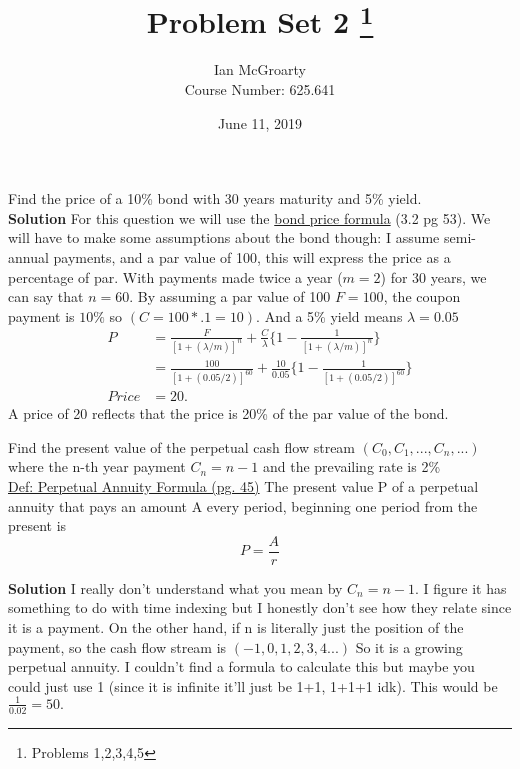 \documentclass[12pt]{article}
\title{Problem Set 2 \thanks{Problems 1,2,3,4,5}}
\author{Ian McGroarty \\
	Course Number: 625.641}
\date{June 11, 2019}
\newenvironment{problem}[2][Problem]{\begin{trivlist}
\item[\hskip \labelsep {\bfseries #1}\hskip \labelsep {\bfseries #2.}]}{\end{trivlist}}
\begin{document}
\maketitle
\newpage

\begin{problem}{1}  Find the price of a 10\% bond with 30 years maturity and 5\% yield. \\
\textbf{Solution} For this question we will use the \underline{bond price formula} (3.2 pg 53). We will have to make some assumptions about the bond though: I assume semi-annual payments, and a par value of 100, this will express the price as a percentage of par. With payments made twice a year ($m=2$) for 30 years, we can say that $n=60$. By assuming a par value of 100 $F=100$, the coupon payment is $10\%$ so $(C=100*.1=10)$.  And a 5\% yield means $\lambda = 0.05$
\begin{align*}
P&= \frac{F}{[1+(\lambda / m)]^n} + \frac{C}{\lambda }\{ 1- \frac{1}{[1+(\lambda / m)]^n}\}\\
&= \frac{100}{[1+(0.05/2)]^60} + \frac{10}{0.05}\{1- \frac{1}{[1+(0.05/2)]^60} \} \\ 
Price &= 20. 
\end{align*}
A price of 20 reflects that the price is 20\% of the par value of the bond. 
\end{problem}

\begin{problem}{2}  Find the present value of the perpetual cash flow stream $(C_0,C_1,...,C_n,...)$ where the n-th year payment $C_n = n-1$ and the prevailing rate is 2\%  \\
 \underline{Def: Perpetual Annuity Formula (pg. 45)} The present value P of a perpetual annuity that pays an amount A every period, beginning one period from the present is $$ P = \frac{A}{r}$$

\textbf{Solution} I really don't understand what you mean by $C_n = n-1$. I figure it has something to do with time indexing but I honestly don't see how they relate since it is a payment. On the other hand, if n is literally just the position of the payment, so the cash flow stream is $(-1,0,1,2,3,4...)$ So it is a growing perpetual annuity. I couldn't find a formula to calculate this but maybe you could just use 1 (since it is infinite it'll just be 1+1, 1+1+1 idk). This would be $\frac{1}{0.02} = 50. $
\end{problem}
\end{document}
